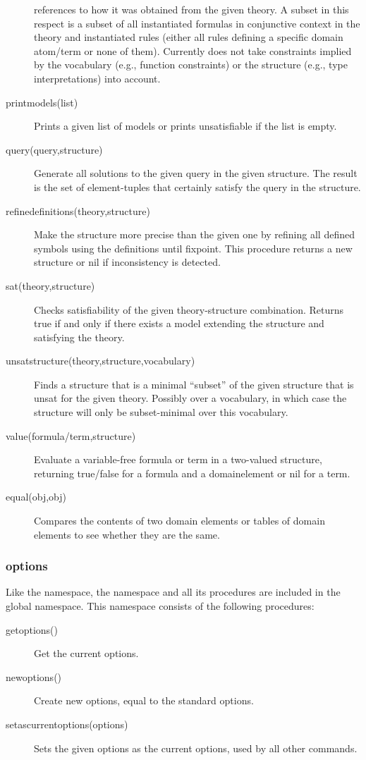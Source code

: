 \begin{description}
		references to how it was obtained from the given theory.
		A subset in this respect is a subset of all instantiated formulas in conjunctive context in the theory and instantiated rules 
		(either all rules defining a specific domain atom/term or none of them).
		Currently does not take constraints implied by the vocabulary (e.g., function constraints) or the structure (e.g., type interpretations) into account.
	\item[printmodels(list)]
		Prints a given list of models or prints unsatisfiable if the list is empty.
	\item[query(query,structure)]
 		Generate all solutions to the given query in the given structure. The result is the set of element-tuples that certainly satisfy the query in the structure.
	\item[refinedefinitions(theory,structure)]
		Make the structure more precise than the given one by refining all defined symbols using the definitions until fixpoint. This procedure returns a new structure or nil if inconsistency is detected.
	\item[sat(theory,structure)]
		Checks satisfiability of the given theory-structure combination. Returns true if and only if there exists a model extending the structure and satisfying the theory.
	\item[unsatstructure(theory,structure,vocabulary)]
		Finds a structure that is a minimal ``subset'' of the given structure that is unsat for the given theory. Possibly over a vocabulary, in which case the structure will only be subset-minimal over this vocabulary.
	\item[value(formula/term,structure)]
		Evaluate a variable-free formula or term in a two-valued structure, returning true/false for a formula and a domainelement or nil for a term.
	\item[equal(obj,obj)]
		Compares the contents of two domain elements or tables of domain elements to see whether they are the same.		
\end{description}

\subsubsection{options}
Like the  namespace, the  namespace and all its procedures are included in the global namespace. This namespace consists of the following procedures:

\begin{description}
	\item[getoptions()]
 		Get the current options.
	\item[newoptions()]
 		Create new options, equal to the standard options.
	\item[setascurrentoptions(options)]
 		Sets the given options as the current options, used by all other commands.
\end{description}

